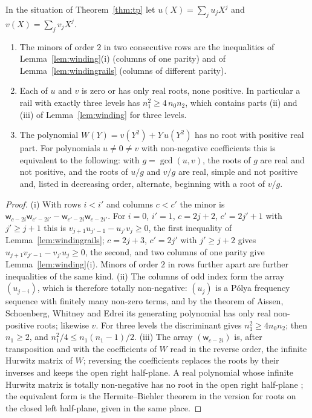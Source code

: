 \begin{corollary}\label{cor:tp}
In the situation of Theorem~\ref{thm:tp} let $u(X)=\sum_ju_jX^j$ and $v(X)=\sum_jv_jX^j$.
\begin{enumerate}[label=(\roman*)]
\item The minors of order $2$ in two consecutive rows are the inequalities of Lemma~\ref{lem:winding}(i) (columns of one parity) and of Lemma~\ref{lem:windingrails} (columns of different parity).
\item Each of $u$ and $v$ is zero or has only real roots, none positive. In particular a rail with exactly three levels has $n_1^{2}\ge4\,n_0n_2$, which contains parts (ii) and (iii) of Lemma~\ref{lem:winding} for three levels.
\item The polynomial $W(Y)=v(Y^{2})+Y\,u(Y^{2})$ has no root with positive real part. For polynomials $u\ne0\ne v$ with non-negative coefficients this is equivalent to the following: with $g=\gcd(u,v)$, the roots of $g$ are real and not positive, and the roots of $u/g$ and $v/g$ are real, simple and not positive and, listed in decreasing order, alternate, beginning with a root of $v/g$.
\end{enumerate}
\end{corollary}
\begin{proof}
(i) With rows $i<i'$ and columns $c<c'$ the minor is $\mathsf{w}_{c-2i}\mathsf{w}_{c'-2i'}-\mathsf{w}_{c'-2i}\mathsf{w}_{c-2i'}$. For $i=0$, $i'=1$, $c=2j+2$, $c'=2j'+1$ with $j'\ge j+1$ this is $v_{j+1}u_{j'-1}-u_{j'}v_j\ge0$, the first inequality of Lemma~\ref{lem:windingrails}; $c=2j+3$, $c'=2j'$ with $j'\ge j+2$ gives $u_{j+1}v_{j'-1}-v_{j'}u_j\ge0$, the second, and two columns of one parity give Lemma~\ref{lem:winding}(i). Minors of order $2$ in rows further apart are further inequalities of the same kind.
(ii) The columns of odd index form the array $(u_{j-i})$, which is therefore totally non-negative: $(u_j)$ is a P\'olya frequency sequence with finitely many non-zero terms, and by the theorem of Aissen, Schoenberg, Whitney and Edrei \cite{aswe} its generating polynomial has only real non-positive roots; likewise $v$. For three levels the discriminant gives $n_1^{2}\ge4n_0n_2$; then $n_1\ge2$, and $n_1^{2}/4\le n_1(n_1-1)/2$.
(iii) The array $(\mathsf{w}_{c-2i})$ is, after transposition and with the coefficients of $W$ read in the reverse order, the infinite Hurwitz matrix of $W$; reversing the coefficients replaces the roots by their inverses and keeps the open right half-plane. A real polynomial whose infinite Hurwitz matrix is totally non-negative has no root in the open right half-plane \cite[Theorem~3.44]{holtztyaglov}; the equivalent form is the Hermite--Biehler theorem in the version for roots on the closed left half-plane, given in the same place.
\end{proof}

